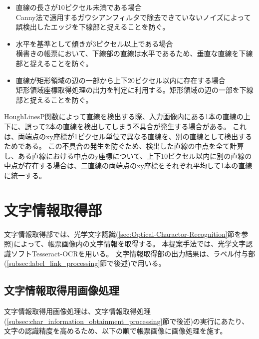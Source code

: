 \begin{itemize}
    \item 直線の長さが10ピクセル未満である場合\\
        Canny法で適用するガウシアンフィルタで除去できていないノイズによって誤検出したエッジを下線部と捉えることを防ぐ。
    \item 水平を基準として傾きが3ピクセル以上である場合\\
        横書きの帳票において、下線部の直線は水平であるため、垂直な直線を下線部と捉えることを防ぐ。
    \item 直線が矩形領域の辺の一部から上下20ピクセル以内に存在する場合\\
        矩形領域座標取得処理の出力を判定に利用する。矩形領域の辺の一部を下線部と捉えることを防ぐ。
\end{itemize}

HoughLinesP関数によって直線を検出する際、入力画像内にある1本の直線の上下に、誤って2本の直線を検出してしまう不具合が発生する場合がある。
これは、両端点のxy座標が1ピクセル単位で異なる直線を、別の直線として検出するためである。
この不具合の発生を防ぐため、検出した直線の中点を全て計算し、ある直線における中点のy座標について、上下10ピクセル以内に別の直線の中点が存在する場合は、二直線の両端点のxy座標をそれぞれ平均して1本の直線に統一する。

\section{文字情報取得部}\label{sec:OCR_part}
文字情報取得部では、光学文字認識(\ref{sec:Optical-Charactor-Recognition}節を参照)によって、帳票画像内の文字情報を取得する。
本提案手法では、光学文字認識ソフトTesseract-OCRを用いる。
文字情報取得部の出力結果は、ラベル付与部(\ref{subsec:label_link_processing}節で後述)で用いる。

\subsection{文字情報取得用画像処理}\label{subsec:image_processing_for_char_recognition}
文字情報取得用画像処理は、文字情報取得処理(\ref{subsec:char_information_obtainment_processing}節で後述)の実行にあたり、文字の認識精度を高めるため、以下の順で帳票画像に画像処理を施す。

